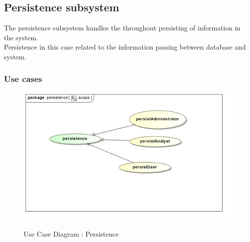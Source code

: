 \documentclass{article}
\begin{document}




	\pagebreak
	\subsection{Persistence subsystem}\label{subsec:Persistence}
	The persistence subsystem handles the throughout persisting of information in the system. \\Persistence in this case related to the information passing between database and system. 
		\subsubsection{Use cases}

		\begin{figure}[H]
		\includegraphics[width=\textwidth]{images/uc__persistence__scope.jpg}  \\
		\caption{Use Case Diagram : Persistence}
		\end{figure}
\end{document}

